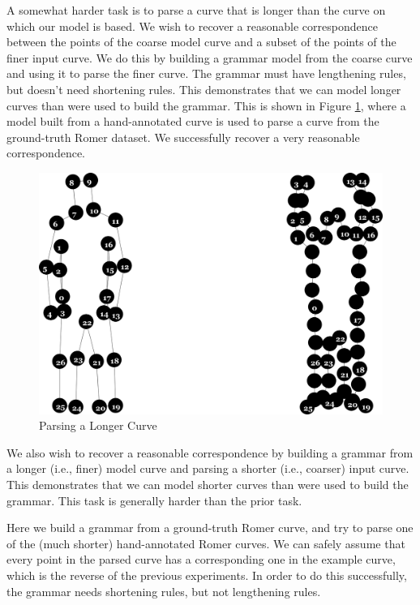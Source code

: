 A somewhat harder task is to parse a curve that is longer than the
curve on which our model is based. We wish to recover a reasonable
correspondence between the points of the coarse model curve and a
subset of the points of the finer input curve. We do this by building
a grammar model from the coarse curve and using it to parse the finer
curve. The grammar must have lengthening rules, but doesn't need
shortening rules. This demonstrates that we can model longer curves
than were used to build the grammar. This is shown in Figure
\ref{fig-longer}, where a model built from a hand-annotated curve is
used to parse a curve from the ground-truth Romer dataset. We
successfully recover a very reasonable correspondence.

\begin{figure}
\includegraphics[width=\linewidth]{output/1.models/longer_curves/parse.png}
\caption{Parsing a Longer Curve}
\label{fig-longer}
\end{figure}

We also wish to recover a reasonable correspondence by building a
grammar from a longer (i.e., finer) model curve and parsing a shorter
(i.e., coarser) input curve. This demonstrates that we can model
shorter curves than were used to build the grammar. This task is
generally harder than the prior task.

Here we build a grammar from a ground-truth Romer curve, and try to
parse one of the (much shorter) hand-annotated Romer curves. We can
safely assume that every point in the parsed curve has a corresponding
one in the example curve, which is the reverse of the previous
experiments. In order to do this successfully, the grammar needs
shortening rules, but not lengthening rules.

